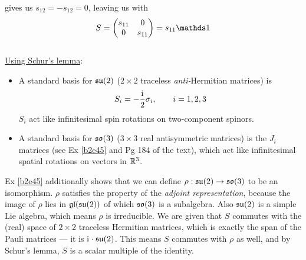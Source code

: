 \documentclass[10pt]{article}
\begin{document}
gives us $s_{12} = -s_{12} = 0$, leaving us with
$$
S = \begin{pmatrix}
	s_{11}&0\\0&s_{11}
\end{pmatrix} = s_{11} \id
$$
\\
\underline{Using Schur's lemma}:\\
\begin{itemize}
	\item A standard basis for $\mathfrak{su}(2)$ ($2\times2$ traceless \emph{anti-}Hermitian matrices) is
	$$
	S_i = -\frac{\mathrm{i}\mkern1mu}{2} \sigma_i, \qquad i = 1,2,3
	$$
	$S_i$ act like infinitesimal spin rotations on two-component spinors.
	\item A standard basis for $\mathfrak{so}(3)$ ($3\times3$ real antisymmetric matrices) is the $J_i$ matrices (see Ex \ref{b2e45} and Pg 184 of the text), which act like infinitesimal spatial rotations on vectors in $\mathbb{R}^3$.
\end{itemize}
Ex \ref{b2e45} additionally shows that we can define $\rho: \mathfrak{su}(2) \to \mathfrak{so}(3)$ to be an isomorphism. $\rho$ satisfies the property of the \emph{adjoint representation}, because the image of $\rho$ lies in $\mathfrak{gl}(\mathfrak{su}(2))$ of which $\mathfrak{so}(3)$ is a subalgebra. Also $\mathfrak{su}(2)$ is a simple Lie algebra, which means $\rho$ is irreducible. We are given that $S$ commutes with the (real) space of $2\times2$ traceless Hermitian matrices, which is exactly the span of the Pauli matrices — it is $\mathrm{i}\mkern1mu \cdot \mathfrak{su}(2)$. This means $S$ commutes with $\rho$ as well, and by Schur's lemma, $S$ is a scalar multiple of the identity.
\end{document}
